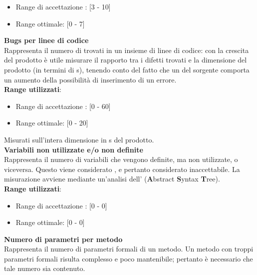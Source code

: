 \begin{itemize}
	\item Range di accettazione : [3 - 10]
	\item Range ottimale: [0 - 7]
\end{itemize}


\textbf{Bugs per linee di codice}\\

Rappresenta il numero di  trovati in un insieme di linee di codice: con la crescita del prodotto è utile misurare il rapporto tra i difetti trovati e la dimensione del prodotto (in termini di s), tenendo conto del fatto che un  del sorgente comporta un aumento della possibilità di inserimento di un errore. \\

\textbf{Range utilizzati}:

\begin{itemize}
	\item Range di accettazione : [0 - 60]
	\item Range ottimale: [0 - 20]
\end{itemize}
Misurati sull'intera dimensione in s del prodotto.\\

\textbf{Variabili non utilizzate e/o non definite}\\

Rappresenta il numero di variabili che vengono definite, ma non utilizzate, o viceversa. Questo viene considerato , e pertanto considerato inaccettabile. La misurazione avviene mediante un'analisi dell'\textbf{} (\textbf{A}bstract \textbf{S}yntax \textbf{T}ree). \\

\textbf{Range utilizzati}:
\begin{itemize}
	\item Range di accettazione : [0 - 0]
	\item Range ottimale: [0 - 0]
\end{itemize}


\textbf{Numero di parametri per metodo}\\

Rappresenta il numero di parametri formali di un metodo. Un metodo con troppi parametri formali risulta complesso e poco mantenibile; pertanto è necessario che tale numero sia contenuto. \\

